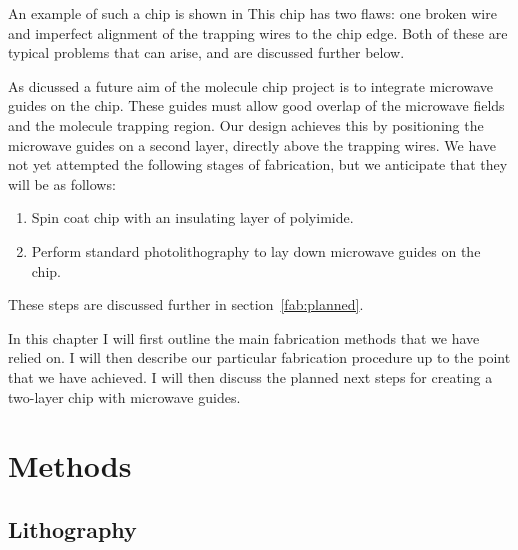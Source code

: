 An example of such a chip is shown in  This chip has two flaws: one broken wire
 and imperfect alignment of the trapping wires
to the chip edge. Both of these are typical problems that can arise, and are
discussed further below.

As dicussed  a future aim of the molecule chip project is to
integrate microwave guides on the chip. These guides must allow good overlap of
the microwave fields and the molecule trapping region. Our design achieves this
by positioning the microwave guides on a second layer, directly above the
trapping wires.  We have not yet attempted the following stages of
fabrication, but we anticipate that they will be as follows:
\begin{enumerate}[resume]
    \item Spin coat chip with an insulating layer of polyimide.
    \item Perform standard photolithography to lay down microwave guides on the
      chip.
\end{enumerate}
These steps are discussed further in section~\ref{fab:planned}.

In this chapter I will first outline the main fabrication methods that we have
relied on. I will then describe our particular fabrication procedure up to the
point that we have achieved. I will then discuss the planned next steps for
creating a two-layer chip with microwave guides.

\section{Methods}




\subsection{Lithography}

